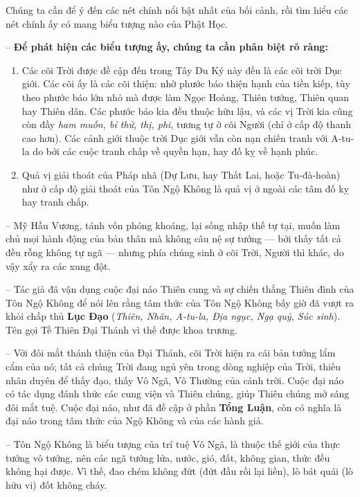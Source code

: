 Chúng ta cần để ý đến các nét chính nổi bật nhất của bối cảnh, rồi tìm hiểu các nét chính ấy có mang biểu tượng nào của Phật Học.

-- {\bf Để phát hiện các biểu tượng ấy, chúng ta cần phân biệt rõ ràng:}

\begin{enumerate}[label=\itshape\alph*\upshape/]

    \item Các cõi Trời được đề cập đến trong Tây Du Ký này đều là các cõi trời Dục giới. Các cõi ấy là các cõi thiện: nhờ phước báo thiện hạnh của tiền kiếp, tùy theo phước báo lớn nhỏ mà được làm Ngọc Hoàng, Thiên tướng, Thiên quan hay Thiên dân. Các phước báo kia đều thuộc hữu lậu, và các vị Trời kia cũng còn đầy \emph{ham muốn, bỉ thử, thị, phi}, tương tự ở cõi Người (chỉ ở cấp độ thanh cao hơn). Các cảnh giới thuộc trời Dục giới vẫn còn nạn chiến tranh với A-tu-la do bởi các cuộc tranh chấp về quyền hạn, hay đố kỵ về hạnh phúc.

    \item Quả vị giải thoát của Pháp nhã (Dự Lưu, hay Thất Lai, hoặc Tu-đà-hoàn) như ở cấp độ giải thoát của Tôn Ngộ Không là quả vị ở ngoài các tâm đố kỵ hay tranh chấp.
\end{enumerate}

-- Mỹ Hầu Vương, tánh vốn phóng khoáng, lại sống nhập thế tự tại, muốn làm chủ mọi hành động của bản thân mà không câu nệ sự tướng --- bởi thấy tất cả đều rỗng không tự ngã --- nhưng phía chúng sinh ở cõi Trời, Người thì khác, do vậy xẩy ra các xung đột.

-- Tác giả đã vận dụng cuộc đại náo Thiên cung và sự chiến thắng Thiên đình của Tôn Ngộ Không để nói lên rằng tâm thức của Tôn Ngộ Không bấy giờ đã vượt ra khỏi chấp thủ {\bf Lục Đạo} (\emph{Thiên, Nhân, A-tu-la, Địa ngục, Ngạ quỷ, Súc sinh}). Tên gọi Tề Thiên Đại Thánh vì thế được khoa trương.

-- Với đôi mắt thánh thiện của Đại Thánh, cõi Trời hiện ra cái bản tướng lẩm cẩm của nó; tất cả chúng Trời đang ngủ yên trong dòng nghiệp của Trời, thiếu nhân duyên để thấy đạo, thấy Vô Ngã, Vô Thường của cảnh trời. Cuộc đại náo có tác dụng đánh thức các cung viện và Thiên chúng, giúp Thiên chúng mở sáng đôi mắt tuệ. Cuộc đại náo, như đã đề cập ở phần \textbf{Tổng Luận}, còn có nghĩa là đại náo trong tâm thức của Ngộ Không và của các hành giả.

-- Tôn Ngộ Không là biểu tượng của trí tuệ Vô Ngã, là thuộc thế giới của thực tướng vô tướng, nên các ngã tướng lửa, nước, gió, đất, không gian, thức đều không hại được. Vì thế, đao chém không đứt (đứt đầu rồi lại liền), lò bát quái (lò hữu vi) đốt không cháy.

